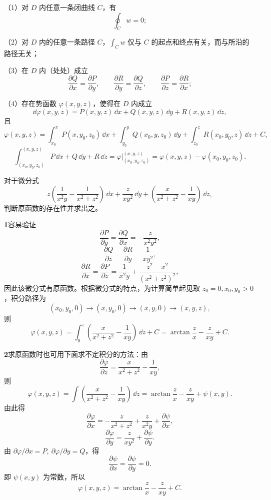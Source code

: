 （1）对 $D$ 内任意一条闭曲线 $C$，有
\[
  \oint_Cw=0;
\]

（2）对 $D$ 内的任意一条路径 $C$，$\int_Cw$ 仅与 $C$ 的起点和终点有关，而与所沿的路径无关；

（3）在 $D$ 内（处处）成立
\[
  \frac{\partial Q}{\partial x}=\frac{\partial P}{\partial y},\qquad
  \frac{\partial R}{\partial y}=\frac{\partial Q}{\partial z},\qquad
  \frac{\partial P}{\partial z}=\frac{\partial R}{\partial x};
\]

（4）存在势函数 $\varphi(x,y,z)$，使得在 $D$ 内成立
\[
  \dd\varphi(x,y,z)=P(x,y,z)\,\dd x+Q(x,y,z)\,\dd y+R(x,y,z)\,\dd z,
\]
且
\begin{equation}
  \varphi(x,y,z)=\int_{x_0}^{x}P(x,y_0,z_0)\,\dd x
  +\int_{y_0}^{y}Q(x_0,y,z_0)\,\dd y
  +\int_{z_0}^{z}R(x_0,y_0,z)\,\dd z+C,
  \tag{25.14}
\end{equation}
\[
  \int_{(x_0,y_0,z_0)}^{(x,y,z)}P\,\dd x+Q\,\dd y+R\,\dd z
  =\left.\varphi\right|_{(x_0,y_0,z_0)}^{(x,y,z)}
  =\varphi(x,y,z)-\varphi(x_0,y_0,z_0).
\]

\begin{xexample}[25.3.6]
对于微分式
\[
  z\left(\frac1{x^2y}-\frac1{x^2+z^2}\right)\,\dd x
  +\frac z{xy^2}\,\dd y
  +\left(\frac x{x^2+z^2}-\frac1{xy}\right)\,\dd z,
\]
判断原函数的存在性并求出之。
\end{xexample}

\begin{xsolution}
\textbf{1}\quad 容易验证
\[
  \frac{\partial P}{\partial y}=\frac{\partial Q}{\partial x}=-\frac z{x^2y^2},
\]
\[
  \frac{\partial Q}{\partial z}=\frac{\partial R}{\partial y}=\frac1{xy^2},
\]
\[
  \frac{\partial R}{\partial x}=\frac{\partial P}{\partial z}=\frac1{x^2y}+\frac{z^2-x^2}{(x^2+z^2)^2},
\]
因此该微分式有原函数。根据微分式的特点，为计算简单起见取 $z_0=0,x_0,y_0>0$，积分路径为
\[
  (x_0,y_0,0)\longrightarrow(x,y_0,0)\longrightarrow(x,y,0)\longrightarrow(x,y,z),
\]
则
\[
  \varphi(x,y,z)=\int_0^z\left(\frac x{x^2+z^2}-\frac1{xy}\right)\,\dd z+C
  =\arctan\frac zx-\frac z{xy}+C.
\]

\textbf{2}\quad 求原函数时也可用下面求不定积分的方法：由
\[
  \frac{\partial\varphi}{\partial z}=\frac x{x^2+z^2}-\frac1{xy},
\]
则
\[
  \varphi(x,y,z)=\int\left(\frac x{x^2+z^2}-\frac1{xy}\right)\,\dd z
  =\arctan\frac zx-\frac z{xy}+\psi(x,y).
\]
由此得
\[
  \frac{\partial\varphi}{\partial x}=-\frac z{x^2+z^2}+\frac z{x^2y}+\frac{\partial\psi}{\partial x},
\]
\[
  \frac{\partial\varphi}{\partial y}=\frac z{xy^2}+\frac{\partial\psi}{\partial y}.
\]
由 $\partial\varphi/\partial x=P,\ \partial\varphi/\partial y=Q$，得
\[
  \frac{\partial\psi}{\partial x}=\frac{\partial\psi}{\partial y}=0.
\]
即 $\psi(x,y)$ 为常数，所以
\[
  \varphi(x,y,z)=\arctan\frac zx-\frac z{xy}+C.
\]
\end{xsolution}

